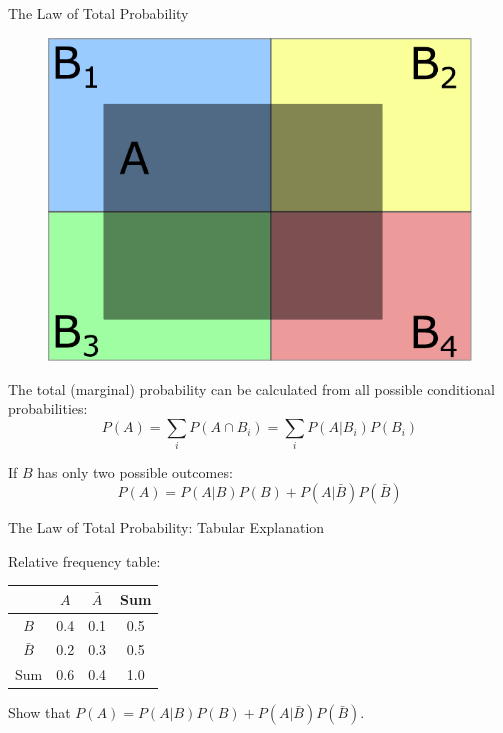\begin{frame}{The Law of Total Probability}
    \begin{figure}
        \includegraphics[width=0.3\linewidth]{gfx/total_probability_boxes}
    \end{figure}
    The total (marginal) probability can be calculated from all possible conditional probabilities:
    \begin{equation}
    P(A) = \sum_{i} P(A \cap B_i) = \sum_{i} P(A|B_i) P(B_i) \label{eq:marginal_probability}
    \end{equation}

    If $B$ has only two possible outcomes:
    \begin{equation*}
    P(A) = P(A|B) P(B) + P(A|\bar{B}) P(\bar{B})
    \end{equation*}
\end{frame}

\begin{frame}{The Law of Total Probability: Tabular Explanation}
   
    Relative frequency table:
    \begin{table}
        \begin{tabular}{c | c c c}
                       & $A$  & $\bar{A}$ & Sum \\ \hline
            $B$        & 0.4  & 0.1       & 0.5 \\
            $\bar{B}$  & 0.2  & 0.3       & 0.5 \\
            Sum        & 0.6  & 0.4       & 1.0 \\
        \end{tabular}
    \end{table}
    Show that $P(A) = P(A|B)P(B) + P(A|\bar{B})P(\bar{B})$.
\end{frame}

